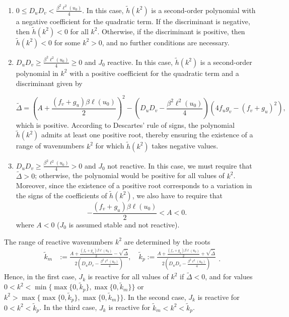 \documentclass{article}
\newcommand{\jac}{J_{k}}
\begin{document}
\begin{enumerate}
\item $0\leq D_u D_v< \frac{\beta^2 \ell^2(u_0)}{4}$. In this case, \( \tilde h(k^2) \) is a second-order polynomial with a negative coefficient for the quadratic term. If the discriminant is negative, then \( \tilde{h}(k^2) < 0 \) for all \( k^2 \). Otherwise, if the discriminant is positive, then \( \tilde{h}(k^2) < 0 \) for some \( k^2 > 0 \), and no further conditions are necessary.

\item $D_u D_v \geq \frac{\beta^2 \ell^2(u_0)}{4}\geq 0$ and $J_{0}$ reactive.
   In this case, \( \tilde h(k^2) \) is a second-order polynomial in \( k^2 \) with a positive coefficient for the quadratic term and a discriminant given by

\[
\tilde{\Delta} = \left(A + \frac{(f_v + g_u)\beta \ell(u_0)}{2}\right)^2 - \left(D_u D_v - \frac{\beta^2 \ell^2(u_0)}{4}\right)(4 f_u g_v - (f_v + g_u)^2),
\]
which is positive. According to Descartes' rule of signs, the polynomial \( \tilde{h}(k^2) \) admits at least one positive root, thereby ensuring the existence of a range of wavenumbers \( k^2 \) for which \( \tilde{h}(k^2) \) takes negative values.

 \item $D_u D_v \geq \frac{\beta^2 \ell^2(u_0)}{4}>0$ and $J_{0}$ not reactive. 
In this case, we must require that \( \tilde{\Delta} > 0 \); otherwise, the polynomial would be positive for all values of \( k^2 \). Moreover, since the existence of a positive root corresponds to a variation in the signs of the coefficients of \( \tilde{h}(k^2) \), we also have to require that
\begin{equation}\label{eq:k2minimo2}
  - \frac{(f_v+g_u)\beta \ell(u_0) }{2} < A <0.
\end{equation}
where $A<0$ ($J_{0}$ is assumed stable and not reactive). 
\end{enumerate}

 The range of reactive wavenumbers $k^2$ are determined by the roots 
\begin{equation}
\label{eq_range_wave_react}
    \begin{aligned}
    \tilde k_m &:= \frac{A +\frac{(f_v+g_u)\beta \ell(u_0) }{2} - \sqrt{\tilde \Delta}}{2\left(D_u D_v -\frac{\beta^2 \ell^2(u_0)}{4}\right)}, \quad \tilde k_p :=\frac{A +\frac{(f_v+g_u)\beta \ell(u_0) }{2}+\sqrt{\tilde \Delta}}{2 \left(D_u D_v -\frac{\beta^2 \ell^2(u_0)}{4}\right)} 
    \end{aligned}.
\end{equation}
 Hence, in the first case, $\jac$ is reactive for all values of $k^2$ if $\tilde{\Delta} < 0$, and for values $0 < k^2 < \min \{ \max \{0,\tilde{k}_p\},\max \{0,\tilde{k}_m\}\}$ or $k^2 > \max \{ \max \{0,\tilde{k}_p\},\max \{0,\tilde{k}_m\}\}$. In the second case, $\jac$ is reactive for 
$0< k^2 < \tilde{k}_p$. In the third case, $\jac$ is reactive for 
$\tilde{k}_m < k^2 < \tilde{k}_p$. 
\end{document}
